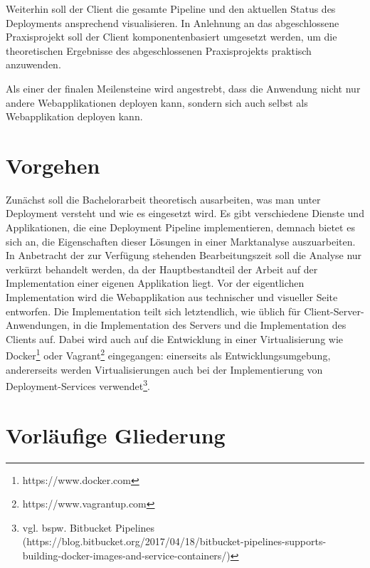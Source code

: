 \documentclass{scrartcl}
\begin{document}
Weiterhin soll der Client die gesamte Pipeline und den aktuellen Status des Deployments ansprechend visualisieren. In Anlehnung an das abgeschlossene Praxisprojekt soll der Client komponentenbasiert umgesetzt werden, um die theoretischen Ergebnisse des abgeschlossenen Praxisprojekts praktisch anzuwenden.

Als einer der finalen Meilensteine wird angestrebt, dass die Anwendung nicht nur andere Webapplikationen deployen kann, sondern sich auch selbst als Webapplikation deployen kann.

\section{Vorgehen}
\label{sec:vorgehen}

Zunächst soll die Bachelorarbeit theoretisch ausarbeiten, was man unter Deployment versteht und wie es eingesetzt wird. Es gibt verschiedene Dienste und Applikationen, die eine Deployment Pipeline implementieren, demnach bietet es sich an, die Eigenschaften dieser Lösungen in einer Marktanalyse auszuarbeiten. In Anbetracht der zur Verfügung stehenden Bearbeitungszeit soll die Analyse nur verkürzt behandelt werden, da der Hauptbestandteil der Arbeit auf der Implementation einer eigenen Applikation liegt. Vor der eigentlichen Implementation wird die Webapplikation aus technischer und visueller Seite entworfen. Die Implementation teilt sich letztendlich, wie üblich für Client-Server-Anwendungen, in die Implementation des Servers und die Implementation des Clients auf. Dabei wird auch auf die Entwicklung in einer Virtualisierung wie Docker\footnote{https://www.docker.com} oder Vagrant\footnote{https://www.vagrantup.com} eingegangen: einerseits als Entwicklungsumgebung, andererseits werden Virtualisierungen auch bei der Implementierung von Deployment-Services verwendet\footnote{vgl. bspw. Bitbucket Pipelines (https://blog.bitbucket.org/2017/04/18/bitbucket-pipelines-supports-building-docker-images-and-service-containers/)}.


\section{Vorläufige Gliederung}
\label{sec:gliederung}
\end{document}
